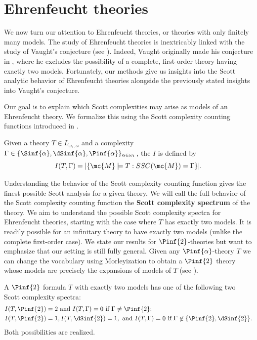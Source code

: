 \documentclass[10pt,a4paper]{amsart}
\renewcommand{\-}{\text{-}}
\begin{document}
\section{Ehrenfeucht theories}
We now turn our attention to Ehrenfeucht theories, or theories with only finitely many models.
The study of Ehrenfeucht theories is inextricably linked with the study of Vaught's conjecture (see \cite{PT25}).
Indeed, Vaught originally made his conjecture in \cite{Vau61}, where he excludes the possibility of a complete, first-order theory having exactly two models. 
Fortunately, our methods give us insights into the Scott analytic behavior of Ehrenfeucht theories alongside the previously stated insights into Vaught's conjecture.

Our goal is to explain which Scott complexities may arise as models of an Ehrenfeucht theory.
We formalize this using the Scott complexity counting functions introduced in \cite{GLRS}.

\begin{definition}
	Given a theory $T\in L_{\omega_1,\omega}$ and a complexity $\Gamma\in\{\Sinf{\alpha},\dSinf{\alpha},\Pinf{\alpha}\}_{\alpha\in\omega_1}$, the  $I$ is defined by
    \[ I(T,\Gamma) = |\{\mc{M}\models T : SSC(\mc{M})=\Gamma\}| .\]
\end{definition}

Understanding the behavior of the Scott complexity counting function gives the finest possible Scott analysis for a given theory.
We will call the full behavior of the Scott complexity counting function the \textbf{Scott complexity spectrum} of the theory.
We aim to understand the possible Scott complexity spectra for Ehrenfeucht theories, starting with the case where $T$ has exactly two models.
It is readily possible for an infinitary theory to have exactly two models (unlike the complete first-order case).
We state our results for $\Pinf{2}$-theories but want to emphasize that our setting is still fully general. Given any $\Pinf{\alpha}$-theory $T$ we can change the vocabulary using Morleyization to obtain a $\Pinf{2}$ theory whose models are precisely the expansions of models of $T$ (see \cite[Chapter II.5]{Part2}).

\begin{proposition}\label{prop:2ModelsClassified}
A $\Pinf{2}$ formula $T$ with exactly two models has one of the following two Scott complexity spectra:
\begin{align} &I(T,\Pinf{2})=2 \text{ and } I(T,\Gamma)=0 \text{ if $\Gamma\neq \Pinf{2}$};\\
 &I(T,\Pinf{2})=1,  I(T,\dSinf{2})=1, \text{ and } I(T,\Gamma)=0 \text{ if $\Gamma\not\in \{\Pinf{2},\dSinf{2}\}$.}\end{align}%
Both possibilities are realized.
\end{proposition}
\end{document}
